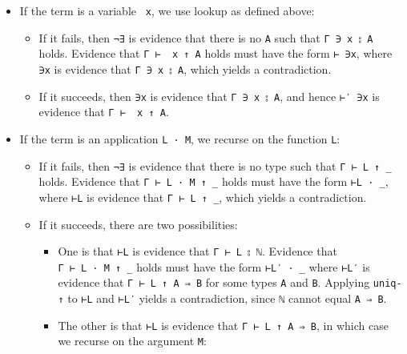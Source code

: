 \begin{itemize}
\item
  If the term is a variable \texttt{\textasciigrave{}\ x}, we use lookup
  as defined above:

  \begin{itemize}
  \item
    If it fails, then \texttt{¬∃} is evidence that there is no
    \texttt{A} such that \texttt{Γ\ ∋\ x\ ⦂\ A} holds. Evidence that
    \texttt{Γ\ ⊢\ \textasciigrave{}\ x\ ↑\ A} holds must have the form
    \texttt{⊢\textasciigrave{}\ ∋x}, where \texttt{∋x} is evidence that
    \texttt{Γ\ ∋\ x\ ⦂\ A}, which yields a contradiction.
  \item
    If it succeeds, then \texttt{∋x} is evidence that
    \texttt{Γ\ ∋\ x\ ⦂\ A}, and hence \texttt{⊢′\ ∋x} is evidence that
    \texttt{Γ\ ⊢\ \textasciigrave{}\ x\ ↑\ A}.
  \end{itemize}
\item
  If the term is an application \texttt{L\ ·\ M}, we recurse on the
  function \texttt{L}:

  \begin{itemize}
  \item
    If it fails, then \texttt{¬∃} is evidence that there is no type such
    that \texttt{Γ\ ⊢\ L\ ↑\ \_} holds. Evidence that
    \texttt{Γ\ ⊢\ L\ ·\ M\ ↑\ \_} holds must have the form
    \texttt{⊢L\ ·\ \_}, where \texttt{⊢L} is evidence that
    \texttt{Γ\ ⊢\ L\ ↑\ \_}, which yields a contradiction.
  \item
    If it succeeds, there are two possibilities:

    \begin{itemize}
    \item
      One is that \texttt{⊢L} is evidence that
      \texttt{Γ\ ⊢\ L\ ⦂\ \textasciigrave{}ℕ}. Evidence that
      \texttt{Γ\ ⊢\ L\ ·\ M\ ↑\ \_} holds must have the form
      \texttt{⊢L′\ ·\ \_} where \texttt{⊢L′} is evidence that
      \texttt{Γ\ ⊢\ L\ ↑\ A\ ⇒\ B} for some types \texttt{A} and
      \texttt{B}. Applying \texttt{uniq-↑} to \texttt{⊢L} and
      \texttt{⊢L′} yields a contradiction, since
      \texttt{\textasciigrave{}ℕ} cannot equal \texttt{A\ ⇒\ B}.
    \item
      The other is that \texttt{⊢L} is evidence that
      \texttt{Γ\ ⊢\ L\ ↑\ A\ ⇒\ B}, in which case we recurse on the
      argument \texttt{M}:


\end{itemize}
\end{itemize}
\end{itemize}
